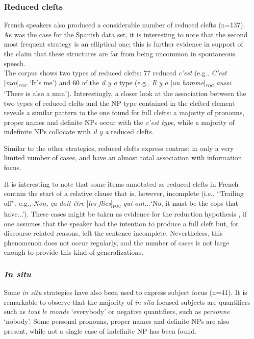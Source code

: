 \subsubsection{Reduced clefts}

French speakers also produced a considerable number of reduced clefts (n=137). As was the case for the Spanish data set, it is interesting to note that the second most frequent strategy is an elliptical one; this is further evidence in support of the claim that these structures are far from being uncommon in spontaneous speech.\\
The corpus shows two types of reduced clefts: 77 reduced \textit{c'est} (e.g., \textit{C'est} [{\textit{moi}}]\textsubscript{\textsc{foc}} \normalsize `It's me') and 60 of the \textit{il y a} type (e.g., \textit{Il y a} [{\textit{un homme}}]\textsubscript{\textsc{foc}} \normalsize \textit{aussi} `There is also a man'). Interestingly, a closer look at the association between the two types of reduced clefts and the NP type contained in the clefted element reveals a similar pattern to the one found for full clefts: a majority of pronouns, proper names and definite NPs occur with the \textit{c'est type}, while a majority of indefinite NPs collocate with \textit{il y a} reduced clefts.

Similar to the other strategies, reduced clefts express contrast in only a very limited number of cases, and have an almost total association with information focus. 

It is interesting to note that some items annotated as reduced clefts in French contain the start of a relative clause that is, however, incomplete (i.e., ``Trailing off'', e.g., \textit{Non, ça doit être}  [{\textit{les flics}}]\textsubscript{\textsc{foc}} \normalsize \textit{qui ont...}`No, it must be the cops that have...'). These cases might be taken as evidence for the reduction hypothesis \parencite{jenkins2017cleft}, if one assumes that the speaker had the intention to produce a full cleft but, for discourse-related reasons, left the sentence incomplete. Nevertheless, this phenomenon does not occur regularly, and the number of cases is not large enough to provide this kind of generalizations.

\subsubsection{\textit{\textbf{In situ}}}

Some \textit{in situ} strategies have also been used to express subject focus (n=41). It is remarkable to observe that the majority of \textit{in situ} focused subjects are quantifiers such as \textit{tout le monde} `everybody' or negative quantifiers, such as \textit{personne} `nobody'. Some personal pronouns, proper names and definite NPs are also present, while not a single case of indefinite NP has been found. 

